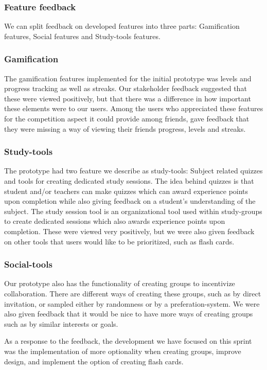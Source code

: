 \subsubsection{Feature feedback}
We can split feedback on developed features into three parts: Gamification features, Social features and Study-tools features.
\subsubsection*{Gamification}
The gamification features implemented for the initial prototype was levels and progress tracking as well as streaks.
Our stakeholder feedback suggested that these were viewed positively,
but that there was a difference in how important these elements were to our users.
Among the users who appreciated these features for the competition aspect it could provide among friends,
gave feedback that they were missing a way of viewing their friends progress, levels and streaks.

\subsubsection*{Study-tools}
The prototype had two feature we describe as study-tools: Subject related quizzes and tools for creating dedicated study sessions. The idea behind quizzes is that student and/or teachers can make quizzes which can award experience points upon completion while also giving feedback on a student's understanding of the subject. The study session tool is an organizational tool used within study-groups to create dedicated sessions which also awards experience points upon completion. These were viewed very positively, but we were also given feedback on other tools that users would like to be prioritized, such as flash cards.

\subsubsection*{Social-tools}
Our prototype also has the functionality of creating groups to incentivize collaboration.
There are different ways of creating these groups, such as by direct invitation,
or sampled either by randomness or by a preferation-system.
We were also given feedback that it would be nice to have more ways of creating groups such as by similar interests or goals.

As a response to the feedback, the development we have focused on this sprint was the
implementation of more optionality when creating groups, improve design, and implement
the option of creating flash cards.

